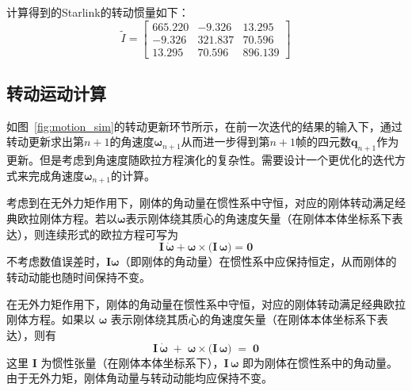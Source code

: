 计算得到的Starlink的转动惯量如下：
\begin{equation}
	\widetilde{I} = 
	\begin{bmatrix}
		665.220 & -9.326 & 13.295 \\
		-9.326 & 321.837 & 70.596 \\
		13.295 & 70.596 & 896.139
	\end{bmatrix}
\end{equation}
\subsection{转动运动计算}

如图~\ref{fig:motion_sim}的转动更新环节所示，在前一次迭代的结果的输入下，通过转动更新求出第$n+1$的角速度$\boldsymbol{\omega}_{n+1}$从而进一步得到第$n+1$帧的四元数$\mathbf{q}_{n+1}$作为更新。但是考虑到角速度随欧拉方程演化的复杂性。需要设计一个更优化的迭代方式来完成角速度$\boldsymbol{\omega}_{n+1}$的计算。

考虑到在无外力矩作用下，刚体的角动量在惯性系中守恒，对应的刚体转动满足经典欧拉刚体方程。若以$\boldsymbol{\omega}$表示刚体绕其质心的角速度矢量（在刚体本体坐标系下表达），则连续形式的欧拉方程可写为
\begin{equation}\label{eq:euler}
	\mathbf{I}\,\dot{\boldsymbol{\omega}} + \boldsymbol{\omega} \times \bigl(\mathbf{I}\,\boldsymbol{\omega}\bigr) = \mathbf{0}
\end{equation}
不考虑数值误差时，$\mathbf{I}\boldsymbol{\omega}$（即刚体的角动量）在惯性系中应保持恒定，从而刚体的转动动能也随时间保持不变。


在无外力矩作用下，刚体的角动量在惯性系中守恒，对应的刚体转动满足经典欧拉刚体方程。如果以 $\boldsymbol{\omega}$ 表示刚体绕其质心的角速度矢量（在刚体本体坐标系下表达），则有
\begin{equation}\label{eq:euler}
	\mathbf{I}\,\dot{\boldsymbol{\omega}}
	\;+\;
	\boldsymbol{\omega} \times \bigl(\mathbf{I}\,\boldsymbol{\omega}\bigr)
	\;=\;
	\mathbf{0}
\end{equation}
这里 $\mathbf{I}$ 为惯性张量（在刚体本体坐标系下），$\mathbf{I}\,\boldsymbol{\omega}$ 即为刚体在惯性系中的角动量。由于无外力矩，刚体角动量与转动动能均应保持不变。


